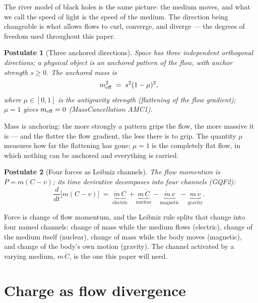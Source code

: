 \documentclass[aps,prd,preprint,superscriptaddress,amsmath,amssymb]{revtex4-2}
\newtheorem{postulate}{Postulate}[section]
\begin{document}
The river model of black holes \cite{hamilton2008river} is the same
picture: the medium moves, and what we call the speed of light is the
speed of the medium.  The direction being changeable is what allows
flows to curl, converge, and diverge --- the degrees of freedom used
throughout this paper.

\begin{postulate}[Three anchored directions]
\label{post:three}
Space has three independent orthogonal directions; a physical object
is an anchored pattern of the flow, with anchor strength
$s\ge 0$.  The anchored mass is
\begin{equation}
\label{eq:anchor}
m^2_{\rm eff}\;=\;s^2(1-\mu)^2 ,
\end{equation}
where $\mu\in[0,1]$ is the antigravity strength
(flattening of the flow gradient); $\mu=1$ gives $m_{\rm eff}=0$
(MassCancellation AMC1).
\end{postulate}

Mass is anchoring: the more strongly a pattern grips the flow, the
more massive it is --- and the flatter the flow gradient, the less
there is to grip.  The quantity $\mu$ measures how far the flattening
has gone; $\mu=1$ is the completely flat flow, in which nothing can be
anchored and everything is carried.

\begin{postulate}[Four forces as Leibniz channels]
\label{post:four}
The flow momentum is $P=m(C-v)$; its time derivative decomposes into
four channels (GQF2):
\begin{equation}
\label{eq:four}
\frac{d}{dt}\bigl[m(C-v)\bigr]
\;=\;\underbrace{\dot m\,C}_{\text{electric}}
+\underbrace{m\,\dot C}_{\text{nuclear}}
-\underbrace{\dot m\,v}_{\text{magnetic}}
-\underbrace{m\,\dot v}_{\text{gravity}} .
\end{equation}
\end{postulate}

Force is change of flow momentum, and the Leibniz rule splits that
change into four named channels: change of mass while the medium flows
(electric), change of the medium itself (nuclear), change of mass while
the body moves (magnetic), and change of the body's own motion
(gravity).  The channel activated by a varying medium, $m\,\dot C$, is
the one this paper will need.

\section{Charge as flow divergence}
\label{sec:charge}
\end{document}
